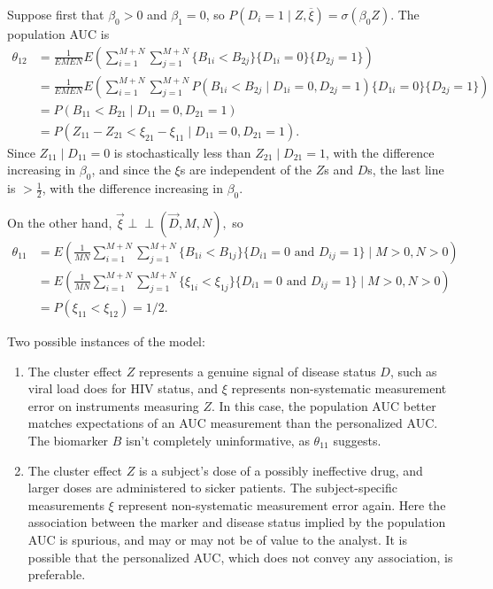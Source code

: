 \documentclass[12pt]{article}
\DeclareMathOperator{\AUC}{AUC}
\newcommand{\E}{E}
\renewcommand{\P}{P}
\newcommand{\cind}{\perp \!\!\! \perp}
\newcommand{\aucindiv}{\theta_{11}}%
\newcommand{\aucpop}{\theta_{12}}%
\begin{document}
Suppose first that $\beta_0>0$ and $\beta_1=0$, so $\P(D_i=1\mid  Z,\overline \xi)=\sigma(\beta_0 Z)$. The population AUC is
\begin{align}
  \aucpop &=\frac{1}{\E M \E N}\E\left(\sum_{i=1}^{M+N}\sum_{j=1}^{M+N}\{B_{1i}<B_{2j}\}\{D_{1i}=0\}\{D_{2j}=1\}\right)\\
	&=\frac{1}{\E M \E N}\E\left(\sum_{i=1}^{M+N}\sum_{j=1}^{M+N}\P(B_{1i}<B_{2j}\mid D_{1i}=0, D_{2j}=1)\{D_{1i}=0\}\{D_{2j}=1\}\right)\\
	&= \P(B_{11}<B_{21}\mid D_{11}=0, D_{21}=1)\\
	&=\P(Z_{11}-Z_{21} < \xi_{21}-\xi_{11}\mid D_{11}=0, D_{21}=1).
\end{align}
Since $Z_{11}\mid D_{11}=0$ is stochastically less than $Z_{21}\mid D_{21}=1$, with the difference increasing in $\beta_0$, and since the $\xi$s are independent of the $Z$s and $D$s, the last line is $>\frac12$, with the difference increasing in $\beta_0$.

On the other hand, $\vec{\xi}\cind (\vec{D},M,N),$ so 
\begin{align}
  \aucindiv &= \E\left(\frac{1}{MN}\sum_{i=1}^{M+N}\sum_{j=1}^{M+N} \{B_{1i}<B_{1j}\}\{D_{i1}=0\text{ and }D_{ij}=1\}\mid M>0,N>0\right)\\
  &= \E\left(\frac{1}{MN}\sum_{i=1}^{M+N}\sum_{j=1}^{M+N} \{\xi_{1i}<\xi_{1j}\}\{D_{i1}=0\text{ and }D_{ij}=1\}\mid M>0,N>0\right)\\
  &=\P(\xi_{11}<\xi_{12})=1/2.
\end{align}

Two possible instances of the model:
\begin{enumerate}[label=(\alph*)]
\item The cluster effect $Z$ represents a genuine signal of disease
status $D$, such as viral load does for HIV status, and $\xi$ represents
non-systematic measurement error on instruments measuring $Z$. In this
case, the population AUC better matches expectations of an AUC
measurement than the personalized AUC. The biomarker $B$ isn't
completely uninformative, as $\aucindiv$ suggests.
\item \label{item:example:threshold model:spurious} The cluster effect $Z$ is a subject's dose of a possibly ineffective drug,
and larger doses are administered to sicker patients. The subject-specific
measurements $\xi$ represent non-systematic measurement error
again. Here the association between the marker and disease status
implied by the population AUC is spurious, and may or may not be of
value to the analyst. It is possible that the personalized AUC, which
does not convey any association, is preferable.
\end{enumerate}
\end{document}
